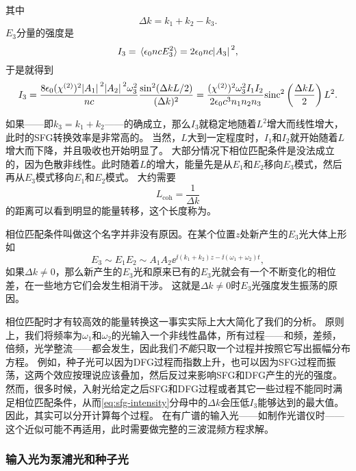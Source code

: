 其中
\begin{equation}
    \Delta k = k_1 + k_2 - k_3.
\end{equation}
$E_3$分量的强度是
\[
    I_3 = \expval*{\epsilon_0 n c E_3^2} = 2 \epsilon_0 n c \abs*{A_3}^2,
\]
于是就得到
\begin{equation}
    I_3 = \frac{8 \epsilon_0 (\chi^{(2)})^2 \abs*{A_1}^2 \abs*{A_2}^2 \omega_3^2}{nc} \frac{\sin^2(\Delta k L / 2)}{(\Delta k)^2} = \frac{(\chi^{(2)})^2 \omega_3^2 I_1 I_2}{2 \epsilon_0 c^3 n_1 n_2 n_3} \mathrm{sinc}^2 \left( \frac{\Delta k L}{2} \right) L^2.
    \label{eq:sfg-intensity}
\end{equation}

如果——即$k_3 = k_1 + k_2$——的确成立，那么$I_3$就稳定地随着$L^2$增大而线性增大，此时的SFG转换效率是非常高的。
当然，$L$大到一定程度时，$I_1$和$I_2$就开始随着$L$增大而下降，并且吸收也开始明显了。
大部分情况下相位匹配条件是没法成立的，因为色散非线性。此时随着$L$的增大，能量先是从$E_1$和$E_2$移向$E_3$模式，然后再从$E_3$模式移向$E_1$和$E_2$模式。
大约需要
\begin{equation}
    L_\text{coh} = \frac{1}{\Delta k}
\end{equation}
的距离可以看到明显的能量转移，这个长度称为。

相位匹配条件叫做这个名字并非没有原因。在某个位置$z$处新产生的$E_3$光大体上形如
\[
    E_3 \sim E_1 E_2 \sim A_1 A_2 \ee^{\ii (k_1 + k_2) z - \ii (\omega_1 + \omega_2) t},
\]
如果$\Delta k \neq 0$，那么新产生的$E_3$光和原来已有的$E_3$光就会有一个不断变化的相位差，在一些地方它们会发生相消干涉。
这就是$\Delta k \neq 0$时$E_3$光强度发生振荡的原因。

相位匹配时才有较高效的能量转换这一事实实际上大大简化了我们的分析。
原则上，我们将频率为$\omega_1$和$\omega_2$的光输入一个非线性晶体，所有过程——和频，差频，倍频，光学整流——都会发生，因此我们\emph{不能}只取一个过程并按照它写出振幅分布方程。
例如，种子光可以因为DFG过程而指数上升，也可以因为SFG过程而振荡，这两个效应按理说应该叠加，然后反过来影响SFG和DFG产生的光的强度。
然而，很多时候，入射光给定之后SFG和DFG过程或者其它一些过程不能同时满足相位匹配条件，从而\eqref{eq:sfg-intensity}分母中的$\Delta k$会压低$I_3$能够达到的最大值。
因此，其实可以分开计算每个过程。
在有广谱的输入光——如制作光谱仪时——这个近似可能不再适用，此时需要做完整的三波混频方程求解。

\subsubsection{输入光为泵浦光和种子光}

